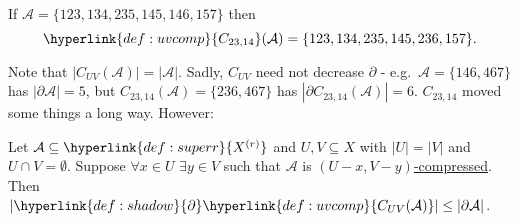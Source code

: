 \documentclass{article}
\let\subset\subseteq
\begin{document}
\begin{eg}
  If $\mathcal{A} = \{123,134,235,145,146,157\}$ then
  \begin{equation*}\hyperlink{def:uvcomp}{C_{23,14}}(\mathcal{A}) = \{123,134,235,145,236,157\}.\end{equation*}
\end{eg}
Note that $|C_{UV}(\mathcal{A})| = |\mathcal{A}|$.
Sadly, \hyperlink{def:uvcomp}{$C_{UV}$} need not decrease \hyperlink{def:shadow}{$\partial$} - e.g.\ $\mathcal{A} = \{146,467\}$ has $|\partial\mathcal{A}| = 5$, but $C_{23,14}(\mathcal{A}) = \{236,467\}$ has $|\partial C_{23,14}(\mathcal{A})| = 6$.
$C_{23,14}$ moved some things a long way.
However:
\begin{nprop}\label{prop:1.6}
  Let $\mathcal{A} \subset \hyperlink{def:superr}{X^{(r)}}$ and $U,V \subseteq X$ with $|U| = |V|$ and $U \cap V = \emptyset$.
  Suppose $\forall x \in U$ $\exists y \in V$ such that $\mathcal{A}$ is \hyperlink{def:uvcomp}{$(U-x, V-y)$-compressed}.
  Then $|\hyperlink{def:shadow}{\partial} \hyperlink{def:uvcomp}{C_{UV}(\mathcal{A})}| \leq |\partial \mathcal{A}|$.
\end{nprop}
\end{document}
